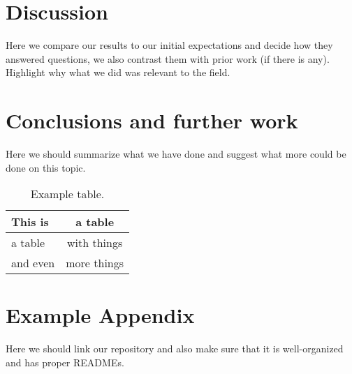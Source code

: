 \documentclass[11pt]{article}
\begin{document}
\section{Discussion}

Here we compare our results to our initial expectations and decide how they answered questions, we also contrast them with prior work (if there is any). Highlight why what we did was relevant to the field.

\section{Conclusions and further work}

Here we should summarize what we have done and suggest what more could be done on this topic.

\begin{table}
\centering
\begin{tabular}{lc}
\hline
\textbf{This is} & \textbf{a table}\\
\hline
a table & with things \\
and even & more things  \\\hline
\end{tabular}
\caption{Example table.}
\label{tab:accents}
\end{table}



\appendix

\section{Example Appendix}
\label{sec:appendix}

Here we should link our repository and also make sure that it is well-organized and has proper READMEs.
\end{document}
